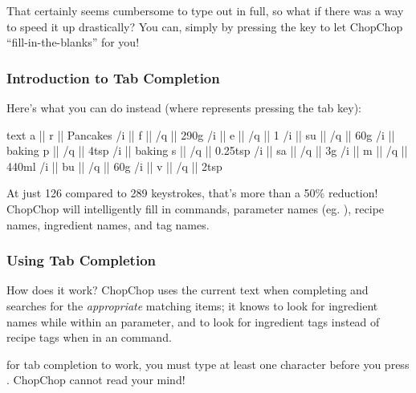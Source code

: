 	That certainly seems cumbersome to type out in full, so what if there was a way to speed it up drastically? You can,
	simply by pressing the  key to let ChopChop \enquote{fill-in-the-blanks} for you!

	\pagebreak
	\subsubsection{Introduction to Tab Completion}

		Here's what you can do instead (where  represents pressing the tab key):
		\begin{blockofcode}{text}
		a || r || Pancakes
		  /i || f || /q || 290g
		  /i || e || /q || 1
		  /i || su || /q || 60g
		  /i || baking p || /q || 4tsp
		  /i || baking s || /q || 0.25tsp
		  /i || sa || /q || 3g
		  /i || m || /q || 440ml
		  /i || bu || /q || 60g
		  /i || v || /q || 2tsp
		\end{blockofcode}

		At just 126 compared to 289 keystrokes, that's more than a 50\% reduction! ChopChop will intelligently fill in commands, parameter names (eg. ), recipe names, ingredient names, and tag names.




	\subsubsection{Using Tab Completion}

		How does it work? ChopChop uses the current text when completing and searches for the \emph{appropriate} matching items;
		it knows to look for ingredient names while within an  parameter, and to look for ingredient tags
		instead of recipe tags when in an  command.

		\begin{infobox}
			\info{} \hspace{.6em}%
			\parbox{0.9\textwidth}{%
				 for tab completion to work, you must type at least one character
				before you press . ChopChop cannot read your mind!
			}
		\end{infobox}

